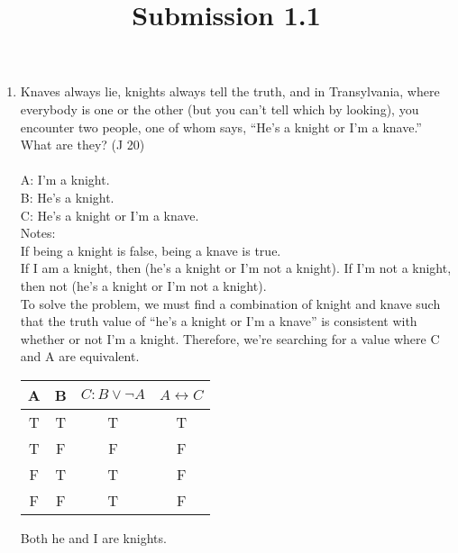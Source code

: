 \documentclass{article}
\title{Submission 1.1}
\date{}
\begin{document}
\maketitle

\begin{enumerate}
      \item Knaves always lie, knights always tell the truth, and in Transylvania, where everybody is one or the other (but you can't tell which by looking), you encounter two people, one of whom says, “He's a knight or I'm a knave.” What are they? (J 20)\\\\
            A: I'm a knight.\\
            B: He's a knight.\\
            C: He's a knight or I'm a knave.\\
            Notes:\\
            If being a knight is false, being a knave is true.\\
            If I am a knight, then (he's a knight or I'm not a knight). If I'm not a knight, then not (he's a knight or I'm not a knight).\\
            To solve the problem, we must find a combination of knight and knave such that the truth value of “he's a knight or I'm a knave” is consistent with whether or not I'm a knight. Therefore, we're searching for a value where C and A are equivalent.\\
            \begin{tabular}{c|c|c|c}
                  A & B & $C: B \lor \neg A$ & $A \leftrightarrow C$ \\
                  \hline
                  T & T & T                  & T                     \\
                  \rowcolor{lightgray} T & F & F                  & F                     \\
                  \rowcolor{lightgray} F & T & T                  & F                     \\
                  \rowcolor{lightgray} F & F & T                  & F                     \\
            \end{tabular}
            Both he and I are knights.
\end{enumerate}
\end{document}
